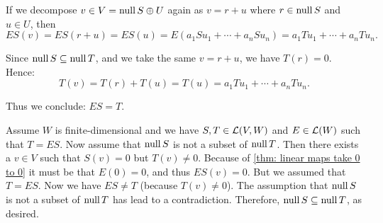 \begin{xrcs}
\begin{prf}
   If we decompose $v \in V = \operatorname{null} S \oplus U$ again as $v = r + u$ where  $r \in \operatorname{null} S$ and $u \in U$, then
   \begin{equation}
     ES ( v ) = ES ( r + u) = ES( u) = E (a_1 S u_1 + \cdots + a_n S u_n) = a_1 T u_1 + \cdots + a_n T u_n.
   \end{equation}

   Since $\operatorname{null} S \subseteq \operatorname{null} T$, and we take the same $v=r+u$, we have $T(r)=0$. Hence:
   \begin{equation}
     T(v) = T(r) + T(u) = T(u) = a_1 T u_1 + \cdots + a_n T u_n.
   \end{equation}

   Thus we conclude: $ES=T$.

   \Leftarrowdirection Assume $W$ is finite-dimensional and we have $S,T \in \mathcal{L}(V,W)$ and $E \in \mathcal{L} (W)$ such that $T=ES$. Now assume that $\operatorname{null} S$ is not a subset of $\operatorname{null} T$. Then there exists a $v \in V$ such that $S(v) = 0$ but $T(v) \neq 0$. Because of \ref{thm: linear maps take 0 to 0} it must be that $E(0) = 0$, and thus $ES(v) = 0$. But we assumed that $T=ES$. Now we have $ES \neq T$ (because $T(v)\neq 0$). The assumption that $\operatorname{null} S$ is not a subset of $\operatorname{null} T$ has lead to a contradiction. Therefore, $\operatorname{null} S \subseteq \operatorname{null} T$, as desired.
  \end{prf}
\end{xrcs}

